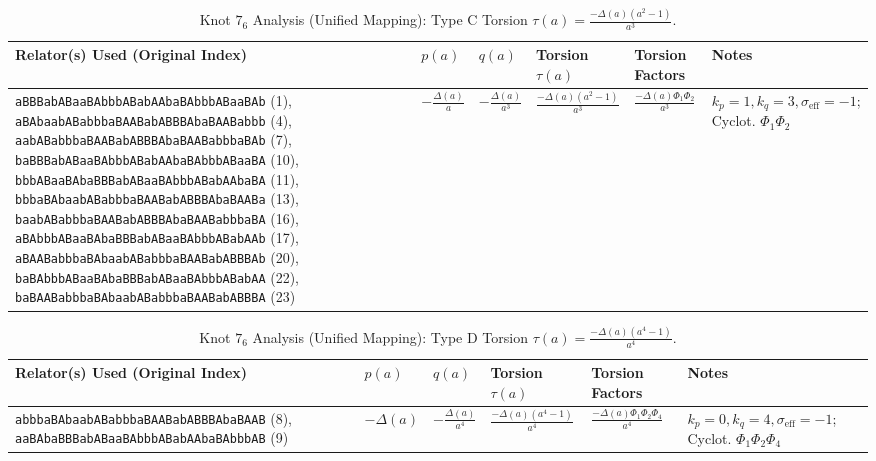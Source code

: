 \documentclass{article}
\begin{document}
\begin{table}[htbp]
\centering
\caption{Knot $7_6$ Analysis (Unified Mapping): Type C Torsion $\tau(a) = \frac{-\Delta(a)(a^2-1)}{a^3}$.}
\label{tab:knot76_type_C}
\scriptsize
\begin{tabular}{@{}p{4.0cm} p{1.8cm} p{1.8cm} p{2.2cm} p{3.0cm} p{3.2cm}@{}}
\toprule
\textbf{Relator(s) Used (Original Index)} & \textbf{$p(a)$} & \textbf{$q(a)$} & \textbf{Torsion $\tau(a)$} & \textbf{Torsion Factors} & \textbf{Notes} \\
\midrule
\texttt{aBBBabABaaBAbbbABabAAbaBAbbbABaaBAb} (1), \texttt{aBAbaabABabbbaBAABabABBBAbaBAABabbb} (4), \texttt{aabABabbbaBAABabABBBAbaBAABabbbaBAb} (7), \texttt{baBBBabABaaBAbbbABabAAbaBAbbbABaaBA} (10), \texttt{bbbABaaBAbaBBBabABaaBAbbbABabAAbaBA} (11), \texttt{bbbaBAbaabABabbbaBAABabABBBAbaBAABa} (13), \texttt{baabABabbbaBAABabABBBAbaBAABabbbaBA} (16), \texttt{aBAbbbABaaBAbaBBBabABaaBAbbbABabAAb} (17), \texttt{aBAABabbbaBAbaabABabbbaBAABabABBBAb} (20), \texttt{baBAbbbABaaBAbaBBBabABaaBAbbbABabAA} (22), \texttt{baBAABabbbaBAbaabABabbbaBAABabABBBA} (23)
& $-\frac{\Delta(a)}{a}$ & $-\frac{\Delta(a)}{a^3}$ & $\frac{-\Delta(a)(a^2-1)}{a^3}$ & $\frac{-\Delta(a)\Phi_1\Phi_2}{a^3}$ & $k_p=1, k_q=3, \sigma_{\text{eff}}=-1$; Cyclot. $\Phi_1\Phi_2$ \\
\bottomrule
\end{tabular}
\end{table}

\begin{table}[htbp]
\centering
\caption{Knot $7_6$ Analysis (Unified Mapping): Type D Torsion $\tau(a) = \frac{-\Delta(a)(a^4-1)}{a^4}$.}
\label{tab:knot76_type_D}
\scriptsize
\begin{tabular}{@{}p{4.0cm} p{1.8cm} p{1.8cm} p{2.2cm} p{3.0cm} p{3.2cm}@{}}
\toprule
\textbf{Relator(s) Used (Original Index)} & \textbf{$p(a)$} & \textbf{$q(a)$} & \textbf{Torsion $\tau(a)$} & \textbf{Torsion Factors} & \textbf{Notes} \\
\midrule
\texttt{abbbaBAbaabABabbbaBAABabABBBAbaBAAB} (8), \texttt{aaBAbaBBBabABaaBAbbbABabAAbaBAbbbAB} (9)
& $-\Delta(a)$ & $-\frac{\Delta(a)}{a^4}$ & $\frac{-\Delta(a)(a^4-1)}{a^4}$ & $\frac{-\Delta(a)\Phi_1\Phi_2\Phi_4}{a^4}$ & $k_p=0, k_q=4, \sigma_{\text{eff}}=-1$; Cyclot. $\Phi_1\Phi_2\Phi_4$ \\
\bottomrule
\end{tabular}
\end{table}
\end{document}
